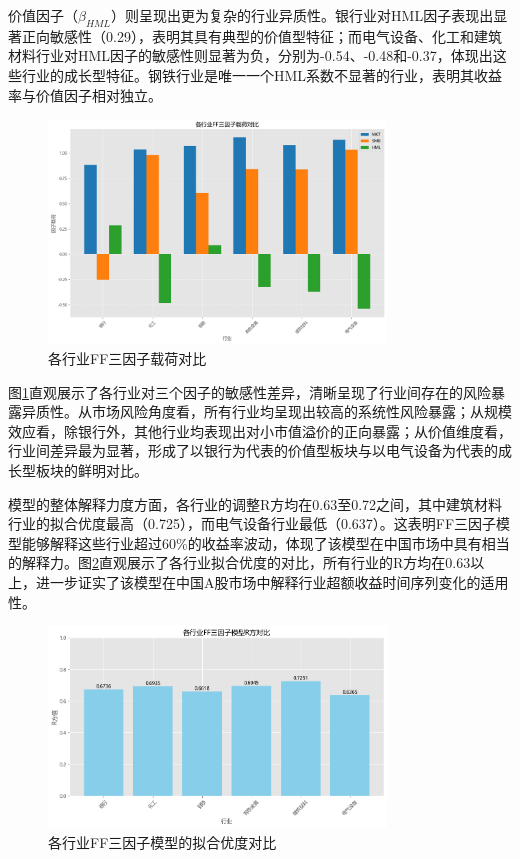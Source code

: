 \documentclass[12pt, a4paper]{article}
\begin{document}
价值因子（$\beta_{HML}$）则呈现出更为复杂的行业异质性。银行业对HML因子表现出显著正向敏感性（0.29），表明其具有典型的价值型特征；而电气设备、化工和建筑材料行业对HML因子的敏感性则显著为负，分别为-0.54、-0.48和-0.37，体现出这些行业的成长型特征。钢铁行业是唯一一个HML系数不显著的行业，表明其收益率与价值因子相对独立。

\begin{figure}[htbp]
\centering
\includegraphics[width=0.8\textwidth]{./img/各行业FF三因子载荷对比.png}
\caption{各行业FF三因子载荷对比}
\label{fig:factor_loadings}
\end{figure}

图\ref{fig:factor_loadings}直观展示了各行业对三个因子的敏感性差异，清晰呈现了行业间存在的风险暴露异质性。从市场风险角度看，所有行业均呈现出较高的系统性风险暴露；从规模效应看，除银行外，其他行业均表现出对小市值溢价的正向暴露；从价值维度看，行业间差异最为显著，形成了以银行为代表的价值型板块与以电气设备为代表的成长型板块的鲜明对比。

模型的整体解释力度方面，各行业的调整R方均在0.63至0.72之间，其中建筑材料行业的拟合优度最高（0.725），而电气设备行业最低（0.637）。这表明FF三因子模型能够解释这些行业超过60\%的收益率波动，体现了该模型在中国市场中具有相当的解释力。图\ref{fig:r_square}直观展示了各行业拟合优度的对比，所有行业的R方均在0.63以上，进一步证实了该模型在中国A股市场中解释行业超额收益时间序列变化的适用性。

\begin{figure}[htbp]
\centering
\includegraphics[width=0.8\textwidth]{./img/各行业R方对比.png}
\caption{各行业FF三因子模型的拟合优度对比}
\label{fig:r_square}
\end{figure}
\end{document}
